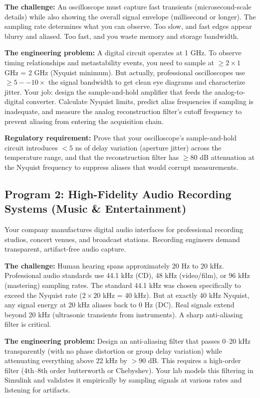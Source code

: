 \documentclass[11pt,letterpaper]{article}
\begin{document}
\textbf{The challenge:} An oscilloscope must capture fast transients (microsecond-scale details) while also showing the overall signal envelope (millisecond or longer). The sampling rate determines what you can observe. Too slow, and fast edges appear blurry and aliased. Too fast, and you waste memory and storage bandwidth.

\textbf{The engineering problem:} A digital circuit operates at 1 GHz. To observe timing relationships and metastability events, you need to sample at $\geq 2 \times 1$ GHz = 2 GHz (Nyquist minimum). But actually, professional oscilloscopes use $\geq 5--10 \times$ the signal bandwidth to get clean eye diagrams and characterize jitter. Your job: design the sample-and-hold amplifier that feeds the analog-to-digital converter. Calculate Nyquist limits, predict alias frequencies if sampling is inadequate, and measure the analog reconstruction filter's cutoff frequency to prevent aliasing from entering the acquisition chain.

\textbf{Regulatory requirement:} Prove that your oscilloscope's sample-and-hold circuit introduces $< 5$ ns of delay variation (aperture jitter) across the temperature range, and that the reconstruction filter has $\geq 80$ dB attenuation at the Nyquist frequency to suppress aliases that would corrupt measurements.

\subsection{Program 2: High-Fidelity Audio Recording Systems (Music \& Entertainment)}

Your company manufactures digital audio interfaces for professional recording studios, concert venues, and broadcast stations. Recording engineers demand transparent, artifact-free audio capture.

\textbf{The challenge:} Human hearing spans approximately 20 Hz to 20 kHz. Professional audio standards use 44.1 kHz (CD), 48 kHz (video/film), or 96 kHz (mastering) sampling rates. The standard 44.1 kHz was chosen specifically to exceed the Nyquist rate ($2 \times 20$ kHz = 40 kHz). But at exactly 40 kHz Nyquist, any signal energy at 20 kHz aliases back to 0 Hz (DC). Real signals extend beyond 20 kHz (ultrasonic transients from instruments). A sharp anti-aliasing filter is critical.

\textbf{The engineering problem:} Design an anti-aliasing filter that passes 0--20 kHz transparently (with no phase distortion or group delay variation) while attenuating everything above 22 kHz by $> 90$ dB. This requires a high-order filter (4th--8th order butterworth or Chebyshev). Your lab models this filtering in Simulink and validates it empirically by sampling signals at various rates and listening for artifacts.
\end{document}
